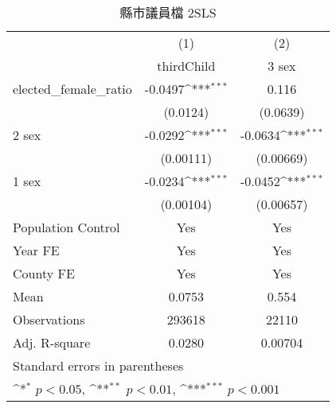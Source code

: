 \begin{table}[htbp]\centering
\def\sym#1{\ifmmode^{#1}\else\(^{#1}\)\fi}
\caption{縣市議員檔 2SLS}
\begin{tabular}{l*{2}{c}}
\toprule
                    &\multicolumn{1}{c}{(1)}&\multicolumn{1}{c}{(2)}\\
                    &\multicolumn{1}{c}{thirdChild}&\multicolumn{1}{c}{3 sex}\\
\midrule
elected\_female\_ratio&     -0.0497\sym{***}&       0.116         \\
                    &    (0.0124)         &    (0.0639)         \\
2 sex               &     -0.0292\sym{***}&     -0.0634\sym{***}\\
                    &   (0.00111)         &   (0.00669)         \\
1 sex               &     -0.0234\sym{***}&     -0.0452\sym{***}\\
                    &   (0.00104)         &   (0.00657)         \\
Population Control  &         Yes         &         Yes         \\
Year FE             &         Yes         &         Yes         \\
County FE           &         Yes         &         Yes         \\
\midrule
Mean                &      0.0753         &       0.554         \\
Observations        &      293618         &       22110         \\
Adj. R-square       &      0.0280         &     0.00704         \\
\bottomrule
\multicolumn{3}{l}{\footnotesize Standard errors in parentheses}\\
\multicolumn{3}{l}{\footnotesize \sym{*} \(p<0.05\), \sym{**} \(p<0.01\), \sym{***} \(p<0.001\)}\\
\end{tabular}
\end{table}
